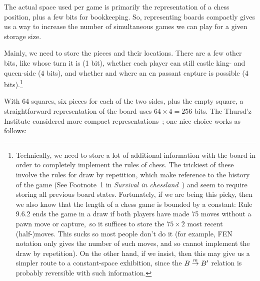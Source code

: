 \documentclass[twocolumn]{amsart}
\begin{document}
The actual space used per game is primarily the representation of
a chess position, plus a few bits for bookkeeping. So, representing
boards compactly gives us a way to increase the number of simultaneous
games we can play for a given storage size.

Mainly, we need to store the pieces and their locations. There are a
few other bits, like whose turn it is (1 bit), whether each player can
still castle king- and queen-side (4 bits), and whether and where an
en passant capture is possible (4 bits).\footnote{
%
Technically, we need to store a lot of additional information with the
board in order to completely implement the rules of
chess.\cite{fiderules} The trickiest of these involve the rules for
draw by repetition, which make reference to the history of the game
(See Footnote~1 in {\it Survival in chessland}~\cite{survival}) and seem
to require storing all previous board states. Fortunately, if we are
being this picky, then we also know that the length of a chess game is
bounded by a constant: Rule 9.6.2 ends the game in a draw if both
players have made 75 moves without a pawn move or
capture,\footnotemark\ so it suffices to store the $75\times 2$ most recent
(half-)moves. This sucks so most people don't do it (for example, FEN
notation only gives the number of such moves, and so cannot implement
the draw by repetition). On the other hand, if we insist, then this
may give us a simpler route to a constant-space exhibition, since the
$B \stackrel{m}{\rightarrow} B'$ relation is probably reversible with such
information.}

With 64 squares, six pieces for each of the two sides, plus the empty
square, a straightforward representation of the board uses $64 \times 4=256$
bits. The Thursd'z Institute considered more compact
representations~\cite{representations}; one nice choice works as follows:
\end{document}
